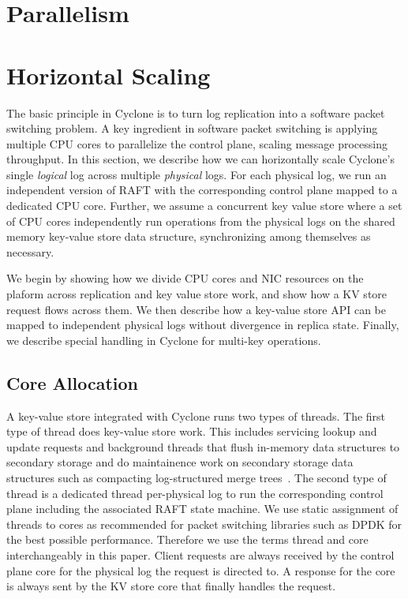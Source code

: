 \documentclass[pageno]{jpaper}
\begin{document}
\section{Parallelism}
\label{sec:parallelism}

\section{Horizontal Scaling}
\label{sec:horizontal}
The basic principle in Cyclone is to turn log replication into a software packet
switching problem. A key ingredient in software packet switching is applying
multiple CPU cores to parallelize the control plane, scaling message processing
throughput. In this section, we describe how we can horizontally scale Cyclone's
single \emph{logical} log across multiple \emph{physical} logs. For each
physical log, we run an independent version of RAFT with the corresponding
control plane mapped to a dedicated CPU core. Further, we assume a concurrent
key value store where a set of CPU cores independently run operations from the
physical logs on the shared memory key-value store data structure, synchronizing
among themselves as necessary.

We begin by showing how we divide CPU cores and NIC resources on the plaform across
replication and key value store work, and show how a KV store request flows
across them.  We then describe how a key-value store API can be mapped to
independent physical logs without divergence in replica state. Finally, we
describe special handling in Cyclone for multi-key operations.

\subsection{Core Allocation}
A key-value store integrated with Cyclone runs two types of threads. The first
type of thread does key-value store work. This includes servicing lookup and
update requests and background threads that flush in-memory data structures to
secondary storage and do maintainence work on secondary storage data structures
such as compacting log-structured merge trees~\cite{lsmtree}. The second type of
thread is a dedicated thread per-physical log to run the corresponding control
plane including the associated RAFT state machine. We use static assignment of
threads to cores as recommended for packet switching libraries such as DPDK for
the best possible performance. Therefore we use the terms thread and core
interchangeably in this paper. Client requests are always received by the
control plane core for the physical log the request is directed to. A response
for the core is always sent by the KV store core that finally handles the
request.
\end{document}
